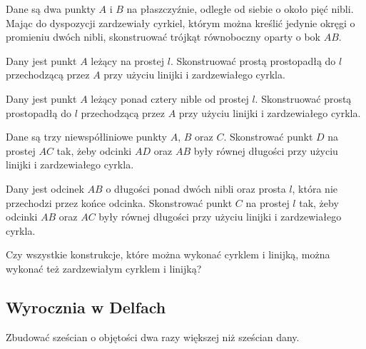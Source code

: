 \begin{problem}
    Dane są dwa punkty $A$ i $B$ na płaszczyźnie, odległe od siebie o około pięć nibli.
    Mając do dyspozycji zardzewiały cyrkiel, którym można kreślić jedynie okręgi o promieniu dwóch nibli, skonstruować trójkąt równoboczny oparty o bok $AB$.
\end{problem}

\begin{problem}
    Dany jest punkt $A$ leżący na prostej $l$.
    Skonstruować prostą prostopadłą do $l$ przechodzącą przez $A$ przy użyciu linijki i zardzewiałego cyrkla.
\end{problem}

\begin{problem}
    Dany jest punkt $A$ leżący ponad cztery nible od prostej $l$.
    Skonstruować prostą prostopadłą do $l$ przechodzącą przez $A$ przy użyciu linijki i zardzewiałego cyrkla.
\end{problem}

\begin{problem}
    Dane są trzy niewspółliniowe punkty $A$, $B$ oraz $C$.
    Skonstrować punkt $D$ na prostej $AC$ tak, żeby odcinki $AD$ oraz $AB$ były równej długości przy użyciu linijki i zardzewiałego cyrkla.
\end{problem}

\begin{problem}
    Dany jest odcinek $AB$ o długości ponad dwóch nibli oraz prosta $l$, która nie przechodzi przez końce odcinka.
    Skonstrować punkt $C$ na prostej $l$ tak, żeby odcinki $AB$ oraz $AC$ były równej długości przy użyciu linijki i zardzewiałego cyrkla.
\end{problem}

\begin{problem}
    Czy wszystkie konstrukcje, które można wykonać cyrklem i linijką, można wykonać też zardzewiałym cyrklem i linijką?
\end{problem}

\subsection{Wyrocznia w Delfach}
\begin{problem}
    Zbudować sześcian o objętości dwa razy większej niż sześcian dany.
\end{problem}


